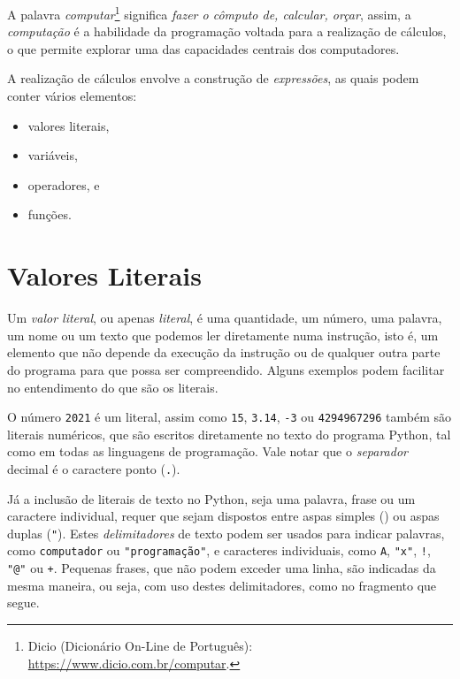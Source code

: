 \documentclass[
]{book}
\providecommand{\tightlist}{%
  \setlength{\itemsep}{0pt}\setlength{\parskip}{0pt}}
\begin{document}
A palavra \emph{computar}\footnote{Dicio (Dicionário On-Line de Português): \url{https://www.dicio.com.br/computar}.} significa \emph{fazer o cômputo de, calcular, orçar}, assim, a \emph{computação} é a habilidade da programação voltada para a realização de cálculos, o que permite explorar uma das capacidades centrais dos computadores.

A realização de cálculos envolve a construção de \emph{expressões}, as quais podem conter vários elementos:

\begin{itemize}
\tightlist
\item
  valores literais,
\item
  variáveis,
\item
  operadores, e
\item
  funções.
\end{itemize}

\hypertarget{comput-liter}{%
\section{Valores Literais}\label{comput-liter}}

Um \emph{valor literal}, ou apenas \emph{literal}, é uma quantidade, um número, uma palavra, um nome ou um texto que podemos ler diretamente numa instrução, isto é, um elemento que não depende da execução da instrução ou de qualquer outra parte do programa para que possa ser compreendido. Alguns exemplos podem facilitar no entendimento do que são os literais.

O número \texttt{2021} é um literal, assim como \texttt{15}, \texttt{3.14}, \texttt{-3} ou \texttt{4294967296} também são literais numéricos, que são escritos diretamente no texto do programa Python, tal como em todas as linguagens de programação. Vale notar que o \emph{separador} decimal é o caractere ponto (\texttt{.}).

Já a inclusão de literais de texto no Python, seja uma palavra, frase ou um caractere individual, requer que sejam dispostos entre aspas simples (\texttt{\textquotesingle{}}) ou aspas duplas (\texttt{"}). Estes \emph{delimitadores} de texto podem ser usados para indicar palavras, como \texttt{\textquotesingle{}computador\textquotesingle{}} ou \texttt{"programação"}, e caracteres individuais, como \texttt{\textquotesingle{}A\textquotesingle{}}, \texttt{"x"}, \texttt{\textquotesingle{}!\textquotesingle{}}, \texttt{"@"} ou \texttt{\textquotesingle{}+\textquotesingle{}}. Pequenas frases, que não podem exceder uma linha, são indicadas da mesma maneira, ou seja, com uso destes delimitadores, como no fragmento que segue.
\end{document}
